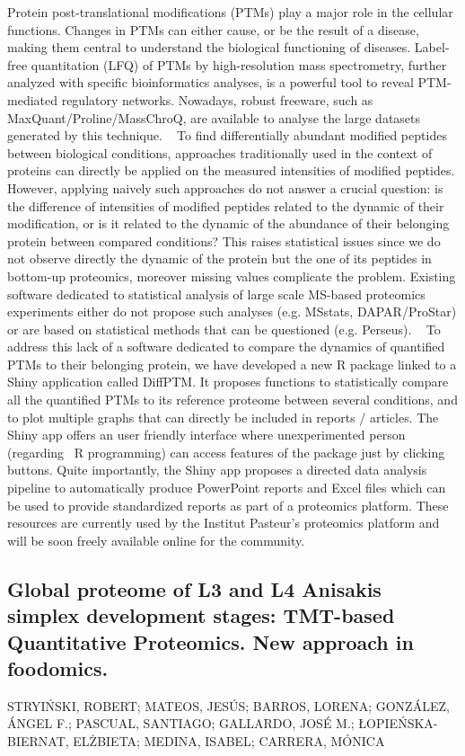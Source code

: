 {Protein post-translational modifications (PTMs) play a major role in the cellular functions. Changes in PTMs can either cause, or be the result of a disease, making them central to understand the biological functioning of diseases. Label-free quantitation (LFQ) of PTMs by high-resolution mass spectrometry, further analyzed with specific bioinformatics analyses, is a powerful tool to reveal PTM-mediated regulatory networks. Nowadays, robust freeware, such as MaxQuant/Proline/MassChroQ, are available to analyse the large datasets generated by this technique.
 
To find differentially abundant modified peptides between biological conditions, approaches traditionally used in the context of proteins can directly be applied on the measured intensities of modified peptides. However, applying naively such approaches do not answer a crucial question: is the difference of intensities of modified peptides related to the dynamic of their modification, or is it related to the dynamic of the abundance of their belonging protein between compared conditions? This raises statistical issues since we do not observe directly the dynamic of the protein but the one of its peptides in bottom-up proteomics, moreover missing values complicate the problem. Existing software dedicated to statistical analysis of large scale MS-based proteomics experiments either do not propose such analyses (e.g. MSstats, DAPAR/ProStar) or are based on statistical methods that can be questioned (e.g. Perseus).
 
To address this lack of a software dedicated to compare the dynamics of quantified PTMs to their belonging protein, we have developed a new R package linked to a Shiny application called DiffPTM. It proposes functions to statistically compare all the quantified PTMs to its reference proteome between several conditions, and to plot multiple graphs that can directly be included in reports / articles. The Shiny app offers an user friendly interface where unexperimented person (regarding  R programming) can access features of the package just by clicking buttons. Quite importantly, the Shiny app proposes a directed data analysis pipeline to automatically produce PowerPoint reports and Excel files which can be used to provide standardized reports as part of a proteomics platform. These resources are currently used by the Institut Pasteur's proteomics platform and will be soon freely available online for the community.


\subsection*{\color{eubicRed} Global proteome of L3 and L4 Anisakis simplex development stages: TMT-based Quantitative Proteomics. New approach in foodomics.}
{\color{eubicGray}STRYIŃSKI, ROBERT;
MATEOS, JESÚS;
BARROS, LORENA;
GONZÁLEZ, ÁNGEL F.;
PASCUAL, SANTIAGO;
GALLARDO, JOSÉ M.;
ŁOPIEŃSKA-BIERNAT, ELŻBIETA;
MEDINA, ISABEL;
CARRERA, MÓNICA}

}
